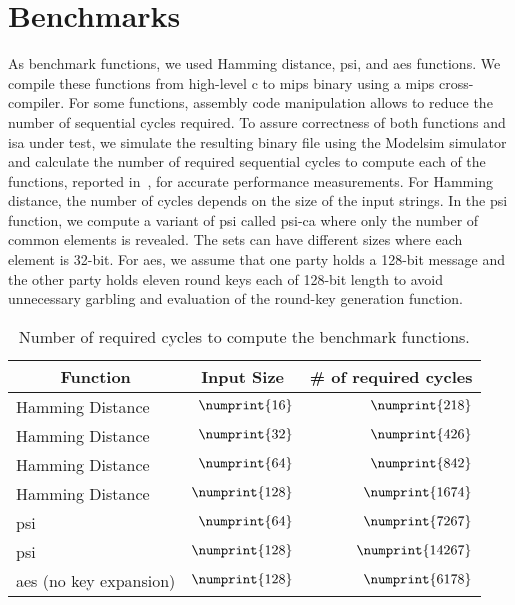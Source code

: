 \section{Benchmarks}\label{ssect:bench}
As benchmark functions, we used Hamming distance, \acrfull{psi}, and \acrshort{aes} functions.
We compile these functions from high-level \gls{c} to \gls{mips} binary using a \gls{mips} cross-compiler.
For some functions, assembly code manipulation allows to reduce the number of sequential cycles required.
To assure correctness of both functions and \acrshort{isa} under test, we simulate the resulting binary file using the Modelsim simulator and calculate the number of required sequential cycles to compute each of the functions, reported in~, for accurate performance measurements.
For Hamming distance, the number of cycles depends on the size of the input strings.
In the \acrshort{psi} function, we compute a variant of \acrshort{psi} called \acrfull{psi-ca} where only the number of common elements is revealed.
The sets can have different sizes where each element is 32-bit.
For \acrshort{aes}, we assume that one party holds a 128-bit message and the other party holds eleven round keys each of 128-bit length to avoid unnecessary garbling and evaluation of the round-key generation function.

\begin{table}
\centering
\caption{Number of required cycles to compute the benchmark functions.}\label{tab:cyc_bench}
\begin{tabular}{l||r|r}
\multicolumn{1}{c||}{Function} & \multicolumn{1}{c|}{Input Size} &  \multicolumn{1}{c}{\# of required cycles} \\
\hline
\hline
Hamming Distance & $\numprint{16}$ & $\numprint{218}$\\
\hline
 Hamming Distance & $\numprint{32}$ & $\numprint{426}$\\
\hline
Hamming Distance & $\numprint{64}$ & $\numprint{842}$\\
\hline
Hamming Distance & $\numprint{128}$ & $\numprint{1674}$\\
\hline
\acrshort{psi} & $\numprint{64}$ &$\numprint{7267}$\\
\hline
\acrshort{psi} & $\numprint{128}$ &$\numprint{14267}$\\
\hline
\acrshort{aes} (no key expansion) & $\numprint{128}$ & $\numprint{6178}$\\
\end{tabular}
\end{table}

